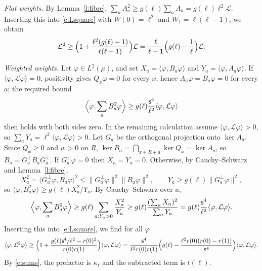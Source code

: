 \emph{Flat weights.} By Lemma~\ref{l:fibre}, $\sum_a A_a^2 \ge g(\ell) \sum_a A_a = g(\ell) \ell^2 \mathcal L$. Inserting this into \eqref{e:Lsquare} with $W(0) = \ell^2$ and $W_1 = \ell(\ell - 1)$, we obtain
\begin{equation*}
\mathcal L^2 \ge \Bigl( 1 + \frac{\ell^2 (g(\ell) - 1)}{\ell(\ell - 1)} \Bigr) \mathcal L = \frac{\ell}{\ell - 1} \Bigl( g(\ell) - \frac1\ell \Bigr) \mathcal L .
\end{equation*}

\emph{Weighted weights.} Let $\varphi \in L^2(\mu)$, and set $X_a = \langle \varphi, B_a \varphi \rangle$ and $Y_a = \langle \varphi, A_a \varphi \rangle$. If $\langle\varphi,\mathcal L\varphi\rangle=0$, positivity gives $Q_x\varphi=0$ for every $x$, hence $A_a\varphi=B_a\varphi=0$ for every $a$; the required bound
\begin{equation*}
\Bigl\langle\varphi,\sum_aB_a^2\varphi\Bigr\rangle
\ge g(\ell)\frac{\mathsf s^4}{\ell^2}
\langle\varphi,\mathcal L\varphi\rangle
\end{equation*}
then holds with both sides zero. In the remaining calculation assume $\langle\varphi,\mathcal L\varphi\rangle>0$, so $\sum_aY_a=\ell^2\langle\varphi,\mathcal L\varphi\rangle>0$. Let $G_a$ be the orthogonal projection onto $\ker A_a$. Since $Q_x \ge 0$ and $w > 0$ on $R$, $\ker B_a = \bigcap_{x \in R + a} \ker Q_x = \ker A_a$, so $B_a = G_a^\perp B_a G_a^\perp$. If $G_a^\perp \varphi = 0$ then $X_a = Y_a = 0$. Otherwise, by Cauchy--Schwarz and Lemma~\ref{l:fibre},
\begin{equation*}
X_a^2 = \langle G_a^\perp \varphi, B_a \varphi \rangle^2 \le \|G_a^\perp \varphi\|^2 \|B_a \varphi\|^2, \qquad Y_a \ge g(\ell) \|G_a^\perp \varphi\|^2,
\end{equation*}
so $\langle \varphi, B_a^2 \varphi \rangle \ge g(\ell) X_a^2 / Y_a$. By Cauchy--Schwarz over $a$,
\begin{equation*}
\Bigl\langle \varphi, \sum_a B_a^2 \varphi \Bigr\rangle \ge g(\ell) \sum_{a : Y_a > 0} \frac{X_a^2}{Y_a} \ge g(\ell) \frac{(\sum_a X_a)^2}{\sum_a Y_a} = g(\ell) \frac{\mathsf s^4}{\ell^2} \langle \varphi, \mathcal L \varphi \rangle .
\end{equation*}
Inserting this into \eqref{e:Lsquare}, we find for all $\varphi$
\begin{equation*}
\langle \varphi, \mathcal L^2 \varphi \rangle \ge \Bigl( 1 + \frac{g(\ell) \mathsf s^4 / \ell^2 - r(0)^2}{r(0) r(1)} \Bigr) \langle \varphi, \mathcal L \varphi \rangle = \frac{\mathsf s^4}{\ell^2 r(0) r(1)} \Bigl( g(\ell) - \frac{\ell^2 r(0) (r(0) - r(1))}{\mathsf s^4} \Bigr) \langle \varphi, \mathcal L \varphi \rangle .
\end{equation*}
By \eqref{e:sums}, the prefactor is $\kappa_\ell$ and the subtracted term is $t(\ell)$.

